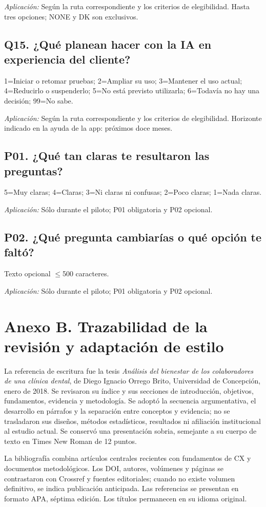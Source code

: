 \documentclass[12pt,letterpaper]{article}
\begin{document}
\emph{Aplicación:} Según la ruta correspondiente y los criterios de elegibilidad. Hasta tres opciones; NONE y DK son exclusivos.

\subsection*{Q15. ¿Qué planean hacer con la IA en experiencia del cliente?}
1=Iniciar o retomar pruebas; 2=Ampliar su uso; 3=Mantener el uso actual; 4=Reducirlo o suspenderlo; 5=No está previsto utilizarla; 6=Todavía no hay una decisión; 99=No sabe.

\emph{Aplicación:} Según la ruta correspondiente y los criterios de elegibilidad. Horizonte indicado en la ayuda de la app: próximos doce meses.

\subsection*{P01. ¿Qué tan claras te resultaron las preguntas?}
5=Muy claras; 4=Claras; 3=Ni claras ni confusas; 2=Poco claras; 1=Nada claras.

\emph{Aplicación:} Sólo durante el piloto; P01 obligatoria y P02 opcional.

\subsection*{P02. ¿Qué pregunta cambiarías o qué opción te faltó?}
Texto opcional $\leq$500 caracteres.

\emph{Aplicación:} Sólo durante el piloto; P01 obligatoria y P02 opcional.

\clearpage
\section*{Anexo B. Trazabilidad de la revisión y adaptación de estilo}
La referencia de escritura \citep{tesis} fue la tesis \emph{Análisis del bienestar de los colaboradores de una clínica dental}, de Diego Ignacio Orrego Brito, Universidad de Concepción, enero de 2018. Se revisaron su índice y sus secciones de introducción, objetivos, fundamentos, evidencia y metodología. Se adoptó la secuencia argumentativa, el desarrollo en párrafos y la separación entre conceptos y evidencia; no se trasladaron sus diseños, métodos estadísticos, resultados ni afiliación institucional al estudio actual. Se conservó una presentación sobria, semejante a su cuerpo de texto en Times New Roman de 12 puntos.

La bibliografía combina artículos centrales recientes con fundamentos de CX y documentos metodológicos. Los DOI, autores, volúmenes y páginas se contrastaron con Crossref y fuentes editoriales; cuando no existe volumen definitivo, se indica publicación anticipada. Las referencias se presentan en formato APA, séptima edición. Los títulos permanecen en su idioma original.
\end{document}

